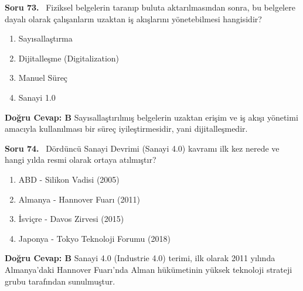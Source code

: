 \documentclass[11pt,a4paper,openany]{book}
\begin{document}
\needspace{5cm}
\vspace{8pt}
\noindent\textbf{\large\sffamily Soru 73.} \ Fiziksel belgelerin taranıp buluta aktarılmasından sonra, bu belgelere dayalı olarak çalışanların uzaktan iş akışlarını yönetebilmesi hangisidir?
\begin{enumerate}[label=\Alph*), leftmargin=25pt, topsep=4pt, itemsep=2pt]
    \item Sayısallaştırma
    \item Dijitalleşme (Digitalization)
    \item Manuel Süreç
    \item Sanayi 1.0
\end{enumerate}
\vspace{4pt}
\begin{tcolorbox}[title=Cevap ve Açıklama, colback=gray!3!white, colframe=primarycolor!90!black, arc=2mm, fonttitle=\bfseries\sffamily, top=6pt, bottom=6pt]
    \textbf{Doğru Cevap: B}
    \vspace{2pt}
    Sayısallaştırılmış belgelerin uzaktan erişim ve iş akışı yönetimi amacıyla kullanılması bir süreç iyileştirmesidir, yani dijitalleşmedir.
\end{tcolorbox}
\vspace{10pt}

\needspace{5cm}
\vspace{8pt}
\noindent\textbf{\large\sffamily Soru 74.} \ Dördüncü Sanayi Devrimi (Sanayi 4.0) kavramı ilk kez nerede ve hangi yılda resmi olarak ortaya atılmıştır?
\begin{enumerate}[label=\Alph*), leftmargin=25pt, topsep=4pt, itemsep=2pt]
    \item ABD - Silikon Vadisi (2005)
    \item Almanya - Hannover Fuarı (2011)
    \item İsviçre - Davos Zirvesi (2015)
    \item Japonya - Tokyo Teknoloji Forumu (2018)
\end{enumerate}
\vspace{4pt}
\begin{tcolorbox}[title=Cevap ve Açıklama, colback=gray!3!white, colframe=primarycolor!90!black, arc=2mm, fonttitle=\bfseries\sffamily, top=6pt, bottom=6pt]
    \textbf{Doğru Cevap: B}
    \vspace{2pt}
    Sanayi 4.0 (Industrie 4.0) terimi, ilk olarak 2011 yılında Almanya'daki Hannover Fuarı'nda Alman hükümetinin yüksek teknoloji strateji grubu tarafından sunulmuştur.
\end{tcolorbox}
\vspace{10pt}
\end{document}
